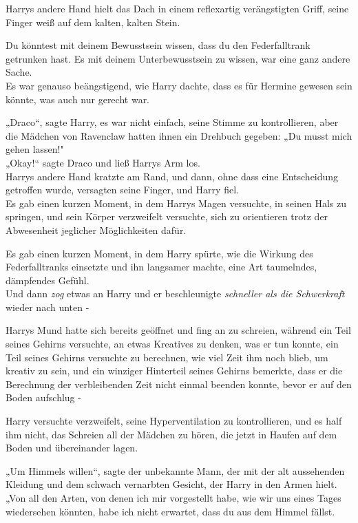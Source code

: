 {Harrys andere Hand hielt das Dach in einem reflexartig verängstigten Griff, seine Finger weiß auf dem kalten, kalten Stein.

Du könntest mit deinem Bewusstsein wissen, dass du den Federfalltrank getrunken hast. Es mit deinem Unterbewusstsein zu wissen, war eine ganz andere Sache.\\ Es war genauso beängstigend, wie Harry dachte, dass es für Hermine gewesen sein könnte, was auch nur gerecht war.

„Draco“, sagte Harry, es war nicht einfach, seine Stimme zu kontrollieren, aber die Mädchen von Ravenclaw hatten ihnen ein Drehbuch gegeben: „Du musst mich gehen lassen!"\\ „Okay!“ sagte Draco und ließ Harrys Arm los.\\ Harrys andere Hand kratzte am Rand, und dann, ohne dass eine Entscheidung getroffen wurde, versagten seine Finger, und Harry fiel.\\ Es gab einen kurzen Moment, in dem Harrys Magen versuchte, in seinen Hals zu springen, und sein Körper verzweifelt versuchte, sich zu orientieren trotz der Abwesenheit jeglicher Möglichkeiten dafür.

Es gab einen kurzen Moment, in dem Harry spürte, wie die Wirkung des Federfalltranks einsetzte und ihn langsamer machte, eine Art taumelndes, dämpfendes Gefühl.\\ Und dann \emph{zog} etwas an Harry und er beschleunigte \emph{schneller als die Schwerkraft} wieder nach unten -

Harrys Mund hatte sich bereits geöffnet und fing an zu schreien, während ein Teil seines Gehirns versuchte, an etwas Kreatives zu denken, was er tun konnte, ein Teil seines Gehirns versuchte zu berechnen, wie viel Zeit ihm noch blieb, um kreativ zu sein, und ein winziger Hinterteil seines Gehirns bemerkte, dass er die Berechnung der verbleibenden Zeit nicht einmal beenden konnte, bevor er auf den Boden aufschlug -

Harry versuchte verzweifelt, seine Hyperventilation zu kontrollieren, und es half ihm nicht, das Schreien all der Mädchen zu hören, die jetzt in Haufen auf dem Boden und übereinander lagen.

„Um Himmels willen“, sagte der unbekannte Mann, der mit der alt aussehenden Kleidung und dem schwach vernarbten Gesicht, der Harry in den Armen hielt. „Von all den Arten, von denen ich mir vorgestellt habe, wie wir uns eines Tages wiedersehen könnten, habe ich nicht erwartet, dass du aus dem Himmel fällst.

}
